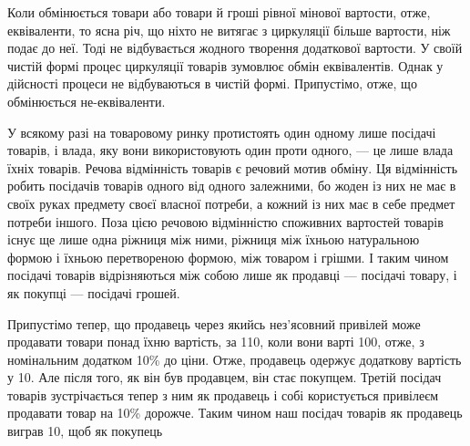 Коли обмінюється товари або товари й гроші рівної мінової
вартости, отже, еквіваленти, то ясна річ, що ніхто не витягає
з циркуляції більше вартости, ніж подає до неї. Тоді не відбувається
жодного творення додаткової вартости. У своїй чистій
формі процес циркуляції товарів зумовлює обмін еквівалентів.
Однак у дійсності процеси не відбуваються в чистій формі. Припустімо,
отже, що обмінюється не-еквіваленти.

У всякому разі на товаровому ринку протистоять один одному
лише посідачі товарів, і влада, яку вони використовують один
проти одного, — це лише влада їхніх товарів. Речова відмінність
товарів є речовий мотив обміну. Ця відмінність робить посідачів
товарів одного від одного залежними, бо жоден із них не має в
своїх руках предмету своєї власної потреби, а кожний із них
має в себе предмет потреби іншого. Поза цією речовою відмінністю
споживних вартостей товарів існує ще лише одна ріжниця
між ними, ріжниця між їхньою натуральною формою і їхньою
перетвореною формою, між товаром і грішми. І таким чином
посідачі товарів відрізняються між собою лише як продавці —
посідачі товару, і як покупці — посідачі грошей.

Припустімо тепер, що продавець через якийсь нез’ясовний
привілей може продавати товари понад їхню вартість, за 110,
коли вони варті 100, отже, з номінальним додатком 10\% до ціни.
Отже, продавець одержує додаткову вартість у 10. Але після
того, як він був продавцем, він стає покупцем. Третій посідач
товарів зустрічається тепер з ним як продавець і собі користується
привілеєм продавати товар на 10\% дорожче. Таким чином
наш посідач товарів як продавець виграв 10, щоб як покупець
\parbreak{}  %

